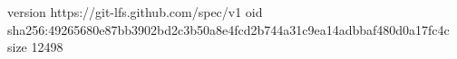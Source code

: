 version https://git-lfs.github.com/spec/v1
oid sha256:49265680e87bb3902bd2c3b50a8e4fcd2b744a31c9ea14adbbaf480d0a17fc4c
size 12498
